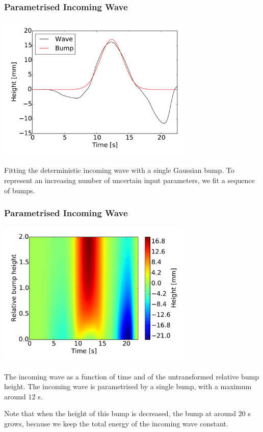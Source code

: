 \documentclass[11pt,ucs]{beamer}
\begin{document}
\begin{frame}\frametitle{Parametrised Incoming Wave}

\begin{center}
\includegraphics[width=0.7\textwidth]{parametrisation_bump}
\end{center}

\small{
Fitting the deterministic incoming wave with a single Gaussian bump. To represent an increasing number of uncertain input parameters, we fit a sequence of bumps.}

\end{frame}

\begin{frame}\frametitle{Parametrised Incoming Wave}

\begin{center}
\includegraphics[width=0.7\textwidth]{illustrate1d_incoming_wave}
\end{center}

\small{
The incoming wave as a function of time and of the untransformed relative bump height. The incoming wave is parametrised by a single bump, with a maximum around $12$ s. 

Note that when the height of this bump is decreased, the bump at around $20$ s grows, because we keep the total energy of the incoming wave constant.}


\end{frame}
\end{document}
